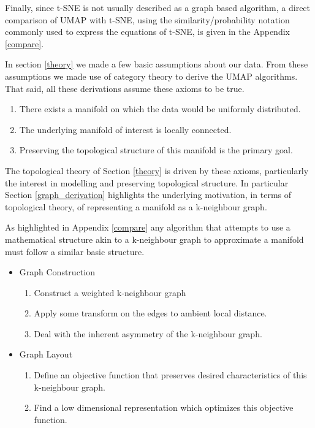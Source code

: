\documentclass[12pt]{article}
\begin{document}
Finally, since t-SNE is not usually described as a graph based algorithm, a direct comparison of UMAP with t-SNE, using the similarity/probability notation commonly used to express the equations of t-SNE, is given in the Appendix \ref{compare}.

In section {\ref{theory}} we made a few basic assumptions about our data. From these assumptions we made use of category theory to derive the UMAP algorithms. That said, all these derivations assume these axioms to be true. 
\begin{enumerate}
    \item There exists a manifold on which the data would be uniformly distributed.
    \item The underlying manifold of interest is locally connected.
    \item Preserving the topological structure of this manifold is the primary goal.
\end{enumerate}
The topological theory of Section {\ref{theory}} is driven by these axioms, particularly the interest in modelling and preserving topological structure. In particular Section {\ref{graph_derivation}} highlights the underlying motivation, in terms of topological theory, of representing a manifold as a k-neighbour graph.

As highlighted in Appendix {\ref{compare}} any algorithm that attempts to use a mathematical structure akin to a k-neighbour graph to approximate a manifold must follow a similar basic structure.

\begin{itemize}
    \item Graph Construction
    \vspace*{-0.8em}
    \begin{enumerate}
        \item Construct a weighted k-neighbour graph
        \item Apply some transform on the edges to ambient local distance.
        \item Deal with the inherent asymmetry of the k-neighbour graph.
    \end{enumerate}
    \item Graph Layout
    \vspace*{-0.8em}
    \begin{enumerate}
        \item Define an objective function that preserves desired characteristics of this k-neighbour graph.
        \item Find a low dimensional representation which optimizes this objective function.       
    \end{enumerate}
\end{itemize}
\end{document}
